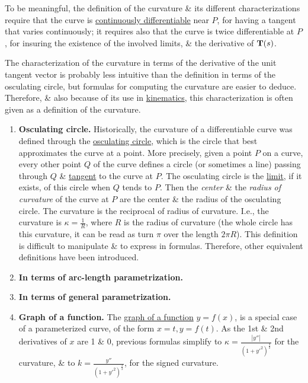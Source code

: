 \documentclass{article}
\begin{document}
To be meaningful, the definition of the curvature \& its different characterizations require that the curve is \href{https://en.wikipedia.org/wiki/Continuously_differentiable}{continuously differentiable} near $P$, for having a tangent that varies continuously; it requires also that the curve is twice differentiable at $P$, for insuring the existence of the involved limits, \& the derivative of ${\bf T}(s)$.

The characterization of the curvature in terms of the derivative of the unit tangent vector is probably less intuitive than the definition in terms of the osculating circle, but formulas for computing the curvature are easier to deduce. Therefore, \& also because of its use in \href{https://en.wikipedia.org/wiki/Kinematics}{kinematics}, this characterization is often given as a definition of the curvature.
\begin{enumerate}
	\item {\bf Osculating circle.} Historically, the curvature of a differentiable curve was defined through the \href{https://en.wikipedia.org/wiki/Osculating_circle}{osculating circle}, which is the circle that best approximates the curve at a point. More precisely, given a point $P$ on a curve, every other point $Q$ of the curve defines a circle (or sometimes a line) passing through $Q$ \& \href{https://en.wikipedia.org/wiki/Tangent_(geometry)}{tangent} to the curve at $P$. The osculating circle is the \href{https://en.wikipedia.org/wiki/Limit_(mathematics)}{limit}, if it exists, of this circle when $Q$ tends to $P$. Then the {\it center} \& the {\it radius of curvature} of the curve at $P$ are the center \& the radius of the osculating circle. The curvature is the reciprocal of radius of curvature. I.e., the curvature is $\kappa = \frac{1}{R}$, where $R$ is the radius of curvature (the whole circle has this curvature, it can be read as turn $\pi$ over the length $2\pi R$). This definition is difficult to manipulate \& to express in formulas. Therefore, other equivalent definitions have been introduced.
	\item {\bf In terms of arc-length parametrization.}
	\item {\bf In terms of general parametrization.}
	\item {\bf Graph of a function.} The \href{https://en.wikipedia.org/wiki/Graph_of_a_function}{graph of a function} $y = f(x)$, is a special case of a parameterized curve, of the form $x = t,y = f(t)$. As the 1st \& 2nd derivatives of $x$ are 1 \& 0, previous formulas simplify to $\kappa = \frac{|y''|}{(1 + y'^2)^{\frac{3}{2}}}$ for the curvature, \& to $k = \frac{y''}{(1 + y'^2)^{\frac{3}{2}}}$, for the signed curvature.
	

\end{enumerate}
\end{document}
